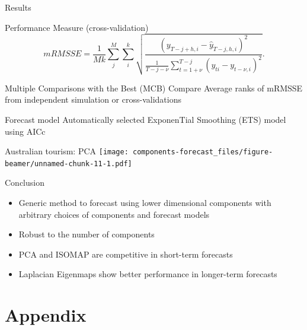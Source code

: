 \documentclass[14pt,ignorenonframetext,]{beamer}
\begin{document}
\begin{frame}{Results}
\protect\hypertarget{results}{}
\begin{block}{Performance Measure (cross-validation)}
\protect\hypertarget{performance-measure-cross-validation}{}
\[
mRMSSE = \frac{1}{Mk}\sum^{M}_j\sum^{k}_i
\sqrt{\frac
{(y_{T-j+h,i}-\hat{y}_{T-j, h,i})^2}
{\frac{1}{T-j-\nu}\sum^{T-j}_{t={1+\nu}}(y_{ti} - y_{t-\nu, i})^2}}.
\]
\end{block}

\begin{block}{Multiple Comparisons with the Best (MCB)}
\protect\hypertarget{multiple-comparisons-with-the-best-mcb}{}
Compare Average ranks of mRMSSE from independent simulation or
cross-validations \citep{Koning2005-ch}
\end{block}

\begin{block}{Forecast model}
\protect\hypertarget{forecast-model-1}{}
Automatically selected ExponenTial Smoothing (ETS) model using AICc
\end{block}
\end{frame}

\begin{frame}{Australian tourism: PCA}
\protect\hypertarget{australian-tourism-pca}{}
\texttt{[image: components-forecast\_files/figure-beamer/unnamed-chunk-11-1.pdf]}
\end{frame}

\begin{frame}{Conclusion}
\protect\hypertarget{conclusion}{}
\begin{itemize}
\item
  Generic method to forecast using lower dimensional components with
  arbitrary choices of components and forecast models
\item
  Robust to the number of components
\item
  PCA and ISOMAP are competitive in short-term forecasts
\item
  Laplacian Eigenmaps show better performance in longer-term forecasts
\end{itemize}
\end{frame}

\hypertarget{appendix}{%
\section{Appendix}\label{appendix}}
\end{document}
